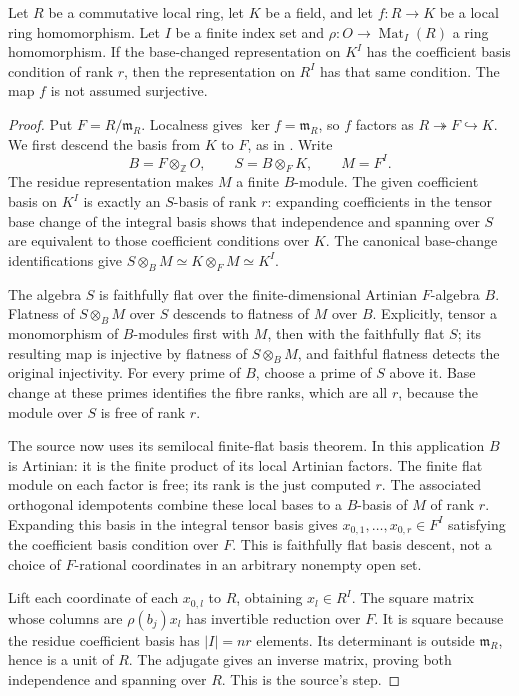 \begin{srlemma}
\label{lem:faithful-free-local-descent}
Let \(R\) be a commutative local ring, let \(K\) be a field,
and let \(f:R\to K\) be a local ring homomorphism.
Let \(I\) be a finite index set and
\(\rho:O\to\operatorname{Mat}_I(R)\) a ring homomorphism.
If the base-changed representation on \(K^I\) has the
coefficient basis condition of rank \(r\), then the representation
on \(R^I\) has that same condition.
The map \(f\) is not assumed surjective.
\end{srlemma}
\begin{proof}
Put \(F=R/\mathfrak m_R\).
Localness gives \(\ker f=\mathfrak m_R\), so \(f\) factors as
\(R\twoheadrightarrow F\hookrightarrow K\).
We first descend the basis from \(K\) to \(F\), as in
.
Write
\[
                  B=F\otimes_{\mathbb Z}O,\qquad
                  S=B\otimes_F K,\qquad M=F^I .
\]
The residue representation makes \(M\) a finite \(B\)-module.
The given coefficient basis on \(K^I\) is exactly an \(S\)-basis
of rank \(r\): expanding coefficients in the tensor base change
of the integral basis shows that independence and spanning over
\(S\) are equivalent to those coefficient conditions over \(K\).
The canonical base-change identifications give
\(S\otimes_B M\simeq K\otimes_F M\simeq K^I\).

The algebra \(S\) is faithfully flat over the finite-dimensional
Artinian \(F\)-algebra \(B\).
Flatness of \(S\otimes_BM\) over \(S\) descends to flatness of
\(M\) over \(B\).
Explicitly, tensor a monomorphism of \(B\)-modules first with
\(M\), then with the faithfully flat \(S\); its resulting map
is injective by flatness of \(S\otimes_BM\), and faithful
flatness detects the original injectivity.
For every prime of \(B\), choose a prime of \(S\) above it.
Base change at these primes identifies the fibre ranks, which
are all \(r\), because the module over \(S\) is free of rank \(r\).

The source now uses its semilocal finite-flat basis theorem.
In this application \(B\) is Artinian: it is the finite product
of its local Artinian factors.  The finite flat module on each
factor is free; its rank is the just computed \(r\).
The associated orthogonal idempotents combine these local bases
to a \(B\)-basis of \(M\) of rank \(r\).
Expanding this basis in the integral tensor basis gives
\(x_{0,1},\ldots,x_{0,r}\in F^I\) satisfying the coefficient
basis condition over \(F\).
This is faithfully flat basis descent, not a choice of
\(F\)-rational coordinates in an arbitrary nonempty open set.

Lift each coordinate of each \(x_{0,l}\) to \(R\), obtaining
\(x_l\in R^I\).
The square matrix whose columns are \(\rho(b_j)x_l\) has
invertible reduction over \(F\).
It is square because the residue coefficient basis has
\(|I|=nr\) elements.
Its determinant is outside \(\mathfrak m_R\), hence is a unit
of \(R\).  The adjugate gives an inverse matrix, proving
both independence and spanning over \(R\).
This is the source's  step.
\end{proof}

